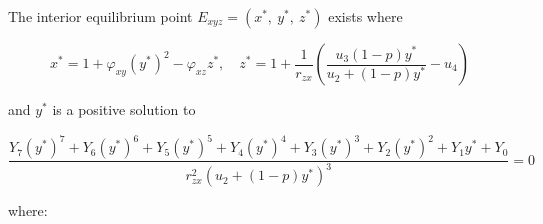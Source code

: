 \begin{theorem}\label{thm:eq-interior-exist}
    The interior equilibrium point $E_{xyz}=\left(x^*,\ y^*,\ z^*\right)$ exists where
    
    \begin{equation*}
        x^*=1+\varphi_{xy}\left(y^*\right)^2-\varphi_{xz}z^*,\quad 
        z^*=1+\frac{1}{r_{zx}}\left(\frac{u_3\left(1-p\right)y^*}{u_2+\left(1-p\right)y^*}-u_4\right)
    \end{equation*}

    and $y^*$ is a positive solution to 

    \begin{equation*}
        \frac{Y_7\left(y^*\right)^7+Y_6\left(y^*\right)^6+Y_5\left(y^*\right)^5+Y_4\left(y^*\right)^4+Y_3\left(y^*\right)^3+Y_2\left(y^*\right)^2+Y_1y^*+Y_0}{r_{zx}^2\left(u_2+\left(1-p\right)y^*\right)^3}=0
    \end{equation*}

    where:


\end{theorem}

